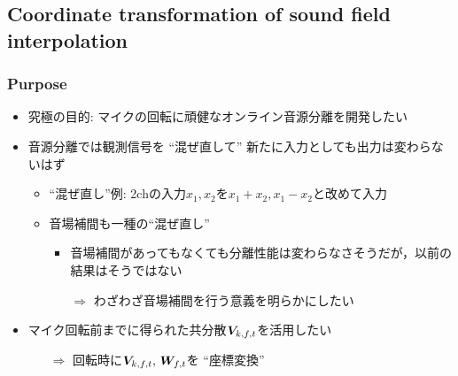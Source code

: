 \documentclass[sip,biber]{now-journal}
\begin{document}


\subsection{Coordinate transformation of sound field interpolation}
\subsubsection{Purpose}
\begin{itemize}
  \item 究極の目的: マイクの回転に頑健なオンライン音源分離を開発したい
  \item 音源分離では観測信号を ``混ぜ直して'' 新たに入力としても出力は変わらないはず
    \begin{itemize}
      \item ``混ぜ直し''例: 2chの入力$x_1, x_2$を$x_1+x_2, x_1-x_2$と改めて入力
      \item 音場補間も一種の``混ぜ直し''
        \begin{itemize}
          \item 音場補間があってもなくても分離性能は変わらなさそうだが，以前の結果はそうではない
          \item[$\Rightarrow$] わざわざ音場補間を行う意義を明らかにしたい
        \end{itemize}
    \end{itemize}
  \item マイク回転前までに得られた共分散$\cov _{\src,\ft}$を活用したい
    \begin{itemize}
      \item[$\Rightarrow$] 回転時に$\cov _{\src,\ft},\, \Demix _{\ft}$を ``座標変換''
    \end{itemize}
\end{itemize}
\end{document}

